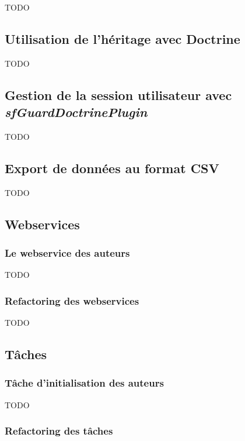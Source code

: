 TODO





\subsection{Utilisation de l'héritage avec Doctrine}

TODO

\subsection{Gestion de la session utilisateur avec \textit{sfGuardDoctrinePlugin}}

TODO

\subsection{Export de données au format CSV}

TODO

\subsection{Webservices}

\subsubsection{Le webservice des auteurs}

TODO

\subsubsection{Refactoring des webservices}

TODO

\subsection{Tâches}

\subsubsection{Tâche d'initialisation des auteurs}

TODO

\subsubsection{Refactoring des tâches}

